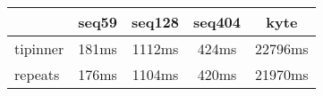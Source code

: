 \begin{tabular}{|l|c|c|c|c|}
\hline
 & seq59 & seq128 & seq404  & kyte \\
\hline
tipinner &  181ms &  1112ms &  424ms &  22796ms\\
\hline
repeats &  176ms &  1104ms &  420ms &  21970ms\\
\hline
\end{tabular}
